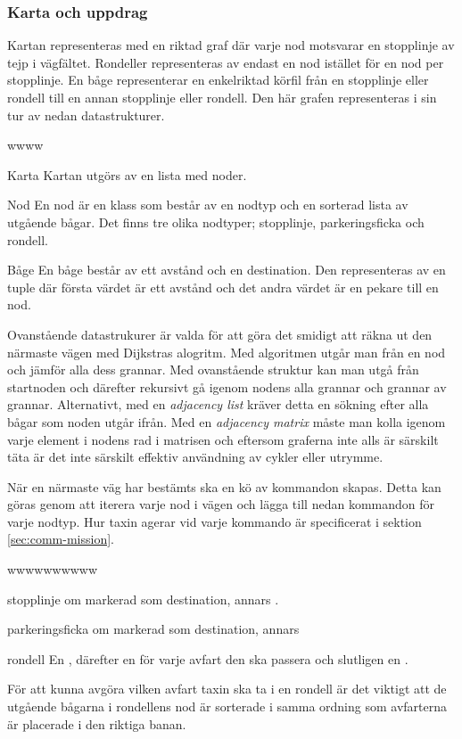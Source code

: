 \documentclass[tekniskrapport/tech.tex]{subfiles}
\begin{document}
\subsubsection{Karta och uppdrag}
Kartan representeras med en riktad graf där varje nod motsvarar en stopplinje
av tejp i vägfältet. Rondeller representeras av endast en nod istället för en
nod per stopplinje. En båge representerar en enkelriktad körfil från en
stopplinje eller rondell till en annan stopplinje eller rondell. Den här grafen
representeras i sin tur av nedan datastrukturer.

\begin{labeling}{wwww}
    \item[Karta] Kartan utgörs av en lista med noder.

    \item[Nod] En nod är en klass som består av en nodtyp och en sorterad lista
        av utgående bågar. Det finns tre olika nodtyper; stopplinje,
        parkeringsficka och rondell. 

    \item[Båge] En båge består av ett avstånd och en destination. Den
        representeras av en tuple där första värdet är ett avstånd och det
        andra värdet är en pekare till en nod.
\end{labeling}
Ovanstående datastrukurer är valda för att göra det smidigt att räkna ut den närmaste
vägen med Dijkstras alogritm. Med algoritmen utgår man från en nod och jämför
alla dess grannar. Med ovanstående struktur kan man utgå från startnoden och därefter
rekursivt gå igenom nodens alla grannar och grannar av grannar. Alternativt,
med en \textit{adjacency list} kräver detta en sökning efter alla bågar som
noden utgår ifrån. Med en \textit{adjacency matrix} måste man kolla igenom
varje element i nodens rad i matrisen och eftersom graferna inte alls är
särskilt täta är det inte särskilt effektiv användning av cykler eller utrymme. 

När en närmaste väg har bestämts ska en kö av kommandon skapas. Detta kan göras
genom att iterera varje nod i vägen och lägga till nedan kommandon för varje
nodtyp. Hur taxin agerar vid varje kommando är specificerat i sektion
\ref{sec:comm-mission}.
\begin{labeling}{wwwwwwwwww}
\item[stopplinje] {\commStop} om markerad som destination, annars \commIgnore.
\item[parkeringsficka] {\commPark} om markerad som destination, annars
    \commIgnore
\item[rondell] En \commEnter, därefter en {\commIgnore} för varje avfart den ska
    passera och slutligen en \commExit.
\end{labeling}
För att kunna avgöra vilken avfart taxin ska ta i en rondell är det viktigt att
de utgående bågarna i rondellens nod är sorterade i samma ordning som
avfarterna är placerade i den riktiga banan.
\end{document}

